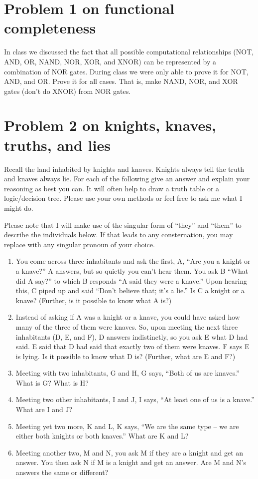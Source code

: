 \documentclass[11pt]{book}
\begin{document}
\section{Problem 1 on functional completeness}
In class we discussed the fact that all possible computational relationships (NOT, AND, OR, NAND, NOR, XOR, and XNOR) can be represented by a combination of NOR gates. During class we were only able to prove it for NOT, AND, and OR. Prove it for all cases. That is, make NAND, NOR, and XOR gates (don’t do XNOR) from NOR gates.

\newpage
\section{Problem 2 on knights, knaves, truths, and lies}
Recall the land inhabited by knights and knaves. Knights always tell the truth and knaves always lie. For each of the following give an answer and explain your reasoning as best you can. It will often help to draw a truth table or a logic/decision tree. Please use your own methods or feel free to ask me what I might do.

Please note that I will make use of the singular form of ``they'' and ``them'' to describe the individuals below. If that leads to any consternation, you may replace with any singular pronoun of your choice.

\begin{enumerate}
	\item You come across three inhabitants and ask the first, A, ``Are you a knight or a knave?'' A answers, but so quietly you can’t hear them. You ask B ``What did A say?” to which B responds “A said they were a knave.'' Upon hearing this, C piped up and said ``Don’t believe that; it’s a lie.'' Is C a knight or a knave? (Further, is it possible to know what A is?)
	\item Instead of asking if A was a knight or a knave, you could have asked how many of the three of them were knaves. So, upon meeting the next three inhabitants (D, E, and F), D answers indistinctly, so you ask E what D had said. E said that D had said that exactly two of them were knaves. F says E is lying. Is it possible to know what D is? (Further, what are E and F?)
	\item Meeting with two inhabitants, G and H, G says, ``Both of us are knaves.'' What is G? What is H?
	\item Meeting two other inhabitants, I and J, I says, ``At least one of us is a knave.'' What are I and J?
	\item Meeting yet two more, K and L, K says, ``We are the same type – we are either both knights or both knaves.'' What are K and L?
	\item Meeting another two, M and N, you ask M if they are a knight and get an answer. You then ask N if M is a knight and get an answer. Are M and N’s answers the same or different? 
\end{enumerate}
\end{document}
